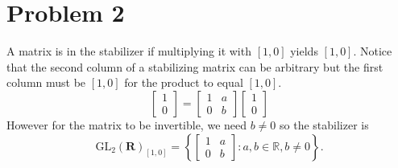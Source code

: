 \documentclass{article}
\begin{document}
\section*{Problem 2}
A matrix is in the stabilizer if multiplying it 
with $[1,0]$ yields $[1,0]$.
Notice that the second column of a stabilizing matrix 
can be arbitrary
but the first column must be $[1,0]$ for 
the product to equal $[1,0]$.
\[
	\begin{bmatrix}
		1 \\ 0
	\end{bmatrix} =
	\begin{bmatrix}
		1 & a \\
		0 & b
	\end{bmatrix}
	\begin{bmatrix}
		1 \\ 0
	\end{bmatrix}
\]
However for the matrix to be invertible, we need $b \neq 0$
so the stabilizer is
\[
    \text{GL}_2(\textbf{R})_{[1,0]} =
	\left\{
	\begin{bmatrix}
		1 & a \\
		0 & b
	\end{bmatrix} :
	a, b \in \mathbb{R}, b\neq 0
	\right\}.
\]
\newpage
\end{document}
